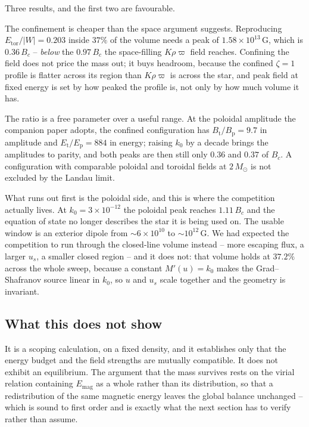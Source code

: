 \documentclass{aa}
\begin{document}
Three results, and the first two are favourable.

The confinement is cheaper than the space argument suggests. Reproducing
$E_{\mathrm{tor}}/|W| = 0.203$ inside $37\%$ of the volume needs a peak of
$1.58\times10^{13}$\,G, which is $0.36\,B_c$ -- \emph{below} the
$0.97\,B_c$ the space-filling $K\rho\varpi$ field reaches. Confining the
field does not price the mass out; it buys headroom, because the confined
$\zeta = 1$ profile is flatter across its region than $K\rho\varpi$ is
across the star, and peak field at fixed energy is set by how peaked the
profile is, not only by how much volume it has.

The ratio is a free parameter over a useful range. At the poloidal
amplitude the companion paper adopts, the confined configuration has
$B_{\mathrm{t}}/B_{\mathrm{p}} = 9.7$ in amplitude and
$E_{\mathrm{t}}/E_{\mathrm{p}} = 884$ in energy; raising $k_0$ by a decade
brings the amplitudes to parity, and both peaks are then still only
$0.36$ and $0.37$ of $B_c$. A configuration with comparable poloidal and
toroidal fields at $2\,M_\odot$ is not excluded by the Landau limit.

What runs out first is the poloidal side, and this is where the
competition actually lives. At $k_0 = 3\times10^{-12}$ the poloidal peak
reaches $1.11\,B_c$ and the equation of state no longer describes the
star it is being used on. The usable window is an exterior dipole from
$\sim6\times10^{10}$ to $\sim10^{12}$\,G. We had expected the competition
to run through the closed-line volume instead -- more escaping flux, a
larger $u_s$, a smaller closed region -- and it does not: that volume
holds at $37.2\%$ across the whole sweep, because a constant $M'(u) = k_0$
makes the Grad--Shafranov source linear in $k_0$, so $u$ and $u_s$ scale
together and the geometry is invariant.

\subsection{What this does not show}

It is a scoping calculation, on a fixed density, and it establishes only
that the energy budget and the field strengths are mutually compatible.
It does not exhibit an equilibrium. The argument that the mass survives
rests on the virial relation containing $E_{\mathrm{mag}}$ as a whole
rather than its distribution, so that a redistribution of the same
magnetic energy leaves the global balance unchanged -- which is sound to
first order and is exactly what the next section has to verify rather
than assume.
\end{document}

